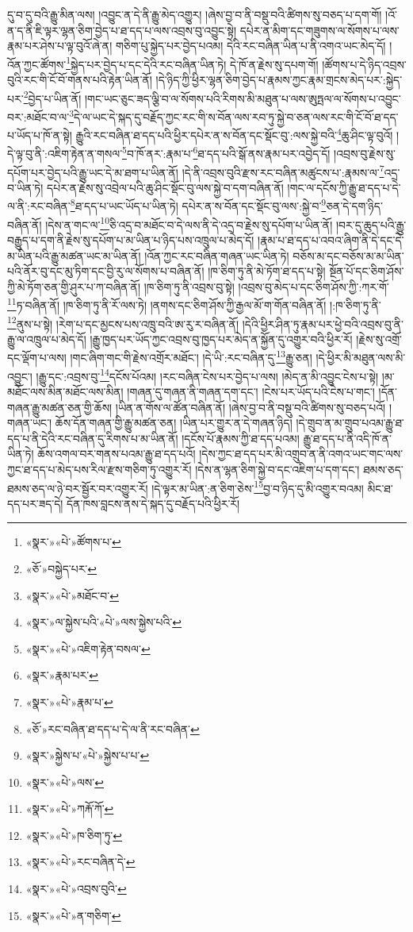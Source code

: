 དུ་བ་དུ་བའི་རྒྱུ་མིན་ལས། །འབྱུང་ན་དེ་ནི་རྒྱུ་མེད་འགྱུར། །ཞེས་བྱ་བ་ནི་བསྡུ་བའི་ཚིགས་སུ་བཅད་པ་དག་གོ། །འོ་ན་ད་ནི་ཇི་ལྟར་ལྷན་ཅིག་བྱེད་པ་ཐ་དད་པ་ལས་འབྲས་བུ་འབྱུང་སྟེ། དཔེར་ན་མིག་དང་གཟུགས་ལ་སོགས་པ་ལས་རྣམ་པར་ཤེས་པ་ལྟ་བུའོ་ཞེ་ན། གཅིག་པུ་སྐྱེད་པར་བྱེད་པའམ། དེའི་རང་བཞིན་ཡིན་པ་ནི་འགའ་ཡང་མེད་དོ། །འོན་ཀྱང་ཚོགས་\footnote{«སྣར་»«པེ་»ཚོགས་པ་}སྐྱེད་པར་བྱེད་པ་དང་དེའི་རང་བཞིན་ཡིན་ཏེ། དེ་ཁོ་ན་རྗེས་སུ་དཔག་གོ། །ཚོགས་པ་དེ་ཉིད་འབྲས་བུའི་རང་གི་ངོ་བོ་གནས་པའི་རྟེན་ཡིན་ནོ། །དེ་ཉིད་ཀྱི་ཕྱིར་ལྷན་ཅིག་བྱེད་པ་རྣམས་ཀྱང་རྣམ་གྲངས་མེད་པར་:སྐྱེད་པར་\footnote{«ཅོ་»བསྐྱེད་པར་}བྱེད་པ་ཡིན་ནོ། །གང་ཡང་ཅུང་ཟད་ལྕི་བ་ལ་སོགས་པའི་རིགས་མི་མཐུན་པ་ལས་ཨུཏྤལ་ལ་སོགས་པ་འབྱུང་བར་:མཐོང་བ་ལ་\footnote{«སྣར་»«པེ་»མཐོང་བ་}དེ་ལ་ཡང་དེ་སྐད་དུ་བརྗོད་ཀྱང་རང་གི་ས་བོན་ལས་རབ་ཏུ་སྐྱེ་བ་ཅན་ལས་རང་གི་ངོ་བོ་ཐ་དད་པ་ཡོད་པ་ཁོ་ན་སྟེ། རྒྱུའི་རང་བཞིན་ཐ་དད་པའི་ཕྱིར་དཔེར་ན་ས་བོན་དང་སྡོང་བུ་:ལས་སྐྱེ་བའི་\footnote{«སྣར་»ལ་སྐྱེས་པའི་«པེ་»ལས་སྐྱེས་པའི་}ཆུ་ཤིང་ལྟ་བུའོ། །དེ་ལྟ་བུ་ནི་:འཇིག་རྟེན་ན་གསལ་\footnote{«སྣར་»«པེ་»འཇིག་རྟེན་བསལ་}བ་ཁོ་ནར་:རྣམ་པ་\footnote{«སྣར་»རྣམ་པར་}ཐ་དད་པའི་སྒོ་ནས་རྣམ་པར་འབྱེད་དོ། །འབྲས་བུ་རྗེས་སུ་དཔོག་པར་བྱེད་པའི་རྒྱུ་ཡང་དེ་མ་ཐག་པ་ཡིན་ནོ། །དེ་ནི་འབྲས་བུའི་རྫས་རང་བཞིན་མཚུངས་པ་:རྣམས་ལ་\footnote{«སྣར་»«པེ་»རྣམ་པ་}འདྲ་བ་ཡིན་ཏེ། དཔེར་ན་རྗེས་སུ་འབྲེལ་པའི་ཆུ་ཤིང་སྡོང་བུ་ལས་སྐྱེ་བ་དག་བཞིན་ནོ། །གང་ལ་དངོས་ཀྱི་རྒྱུ་ཐ་དད་པ་དེ་ལ་ནི་:རང་བཞིན་\footnote{«ཅོ་»རང་བཞིན་ཐ་དད་པ་དེ་ལ་ནི་རང་བཞིན་}ཐ་དད་པ་ཡང་ཡོད་པ་ཡིན་ཏེ། དཔེར་ན་ས་བོན་དང་སྡོང་བུ་ལས་:སྐྱེ་བ་\footnote{«སྣར་»སྐྱེས་པ་«པེ་»སྐྱེས་པ་པ་}ཅན་དེ་དག་ཉིད་བཞིན་ནོ། །དེས་ན་གང་ལ་\footnote{«སྣར་»«པེ་»ལས་}ཅི་འདྲ་བ་མཐོང་བ་དེ་ལས་ནི་དེ་འདྲ་བ་རྗེས་སུ་དཔོག་པ་ཡིན་ནོ། །བར་དུ་ཆུད་པའི་རྒྱུ་བརྒྱུད་པ་དག་ནི་རྗེས་སུ་དཔོག་པ་མ་ཡིན་པ་ཉིད་པས་འཁྲུལ་པ་མེད་དོ། །རྣམ་པ་ཐ་དད་པ་འབའ་ཞིག་ནི་དེ་དང་དེ་མ་ཡིན་པའི་རྒྱུ་མཚན་ཡང་མ་ཡིན་ནོ། །འོན་ཀྱང་རང་བཞིན་གཞན་ཡང་ཡིན་ཏེ། བཅོས་མ་དང་བཅོས་མ་མ་ཡིན་པའི་ནོར་བུ་དང་མུ་ཏིག་དང་བྱི་རུ་ལ་སོགས་པ་བཞིན་ནོ། །ཁ་ཅིག་ཏུ་ནི་མེ་ཏོག་ཐ་དད་པ་སྟེ། སྔོན་པོ་དང་ཅིག་ཤོས་ཀྱི་མེ་ཏོག་ཅན་གྱི་ཤུར་པ་ཀ་བཞིན་ནོ། །ཁ་ཅིག་ཏུ་ནི་འབྲས་བུ་སྟེ། །འབྲས་བུ་མེད་པ་དང་ཅིག་ཤོས་ཀྱི་:ཀར་གོ་\footnote{«སྣར་»«པེ་»ཀརྐོ་ཀོ་}ཏ་བཞིན་ནོ། །ཁ་ཅིག་ཏུ་ནི་རོ་ལས་ཏེ། །ནགས་དང་ཅིག་ཤོས་ཀྱི་རྒྱལ་མོ་ག་གོན་བཞིན་ནོ། །:ཁ་ཅིག་ཏུ་ནི་\footnote{«སྣར་»«པེ་»ཁ་ཅིག་ཏུ་}ནུས་པ་སྟེ། །རེག་པ་དང་མྱངས་པས་འཁྲུ་བའི་ཨ་རུ་ར་བཞིན་ནོ། །དེའི་ཕྱིར་ཤིན་ཏུ་རྣམ་པར་ཕྱེ་བའི་འབྲས་བུ་ནི་རྒྱུ་ལ་འཁྲུལ་པ་མེད་དོ། །རྒྱུ་ཁྱད་པར་ཡོད་ཀྱང་འབྲས་བུ་ཁྱད་པར་མེད་ན་སྐྱོན་དུ་འགྱུར་བའི་ཕྱིར་རོ། །རྗེས་སུ་འགྲོ་དང་ལྡོག་པ་ལས། །གང་ཞིག་གང་གི་རྗེས་འགྲོར་མཐོང་། །དེ་ཡི་:རང་བཞིན་དུ་\footnote{«སྣར་»«པེ་»རང་བཞིན་དེ་}རྒྱུ་ཅན། །དེ་ཕྱིར་མི་མཐུན་ལས་མི་འབྱུང་། །རྒྱུ་དང་:འབྲས་བུ་\footnote{«སྣར་»«པེ་»འབྲས་བུའི་}དངོས་པོའམ། །རང་བཞིན་ངེས་པར་བྱེད་པ་ལས། །མེད་ན་མི་འབྱུང་ངེས་པ་སྟེ། །མ་མཐོང་ལས་མིན་མཐོང་ལས་མིན། །གཞན་དུ་གཞན་ནི་གཞན་དག་དང་། །ངེས་པར་ཡོད་པའི་ངེས་པ་གང་། །དོན་གཞན་རྒྱུ་མཚན་ཅན་གྱི་ཆོས། །ཡིན་ན་གོས་ལ་ཚོན་བཞིན་ནོ། །ཞེས་བྱ་བ་ནི་བསྡུ་བའི་ཚིགས་སུ་བཅད་པའོ། །གཞན་ཡང་། ཆོས་དོན་གཞན་གྱི་རྒྱུ་མཚན་ཅན། །ཡིན་པར་གྱུར་ན་དེ་གཞན་ཉིད། །དེ་གྲུབ་ན་མ་གྲུབ་པའམ་རྒྱུ་ཐ་དད་པ་ནི་དེའི་རང་བཞིན་དུ་རིགས་པ་མ་ཡིན་ནོ། །དངོས་པོ་རྣམས་ཀྱི་ཐ་དད་པའམ། རྒྱུ་ཐ་དད་པ་ནི་འདི་ཁོ་ན་ཡིན་ཏེ། ཆོས་འགལ་བར་གནས་པའམ་རྒྱུ་ཐ་དད་པའོ། །དེས་ཀྱང་ཐ་དད་པར་མི་འགྲུབ་ན་ནི་འགའ་ཡང་གང་ལས་ཀྱང་ཐ་དད་པ་མེད་པས་རིལ་རྫས་གཅིག་ཏུ་འགྱུར་རོ། །དེས་ན་ལྷན་ཅིག་སྐྱེ་བ་དང་འཇིག་པ་དག་དང་། ཐམས་ཅད་ཐམས་ཅད་ལ་ཉེ་བར་སྦྱོར་བར་འགྱུར་རོ། །དེ་ལྟར་མ་ཡིན་:ན་ཅིག་ཅེས་\footnote{«སྣར་»«པེ་»ན་གཅིག་}བྱ་བ་ཉིད་དུ་མི་འགྱུར་བའམ། མིང་ཐ་དད་པར་ཟད་དེ། དོན་ཁས་བླངས་ནས་དེ་སྐད་དུ་བརྗོད་པའི་ཕྱིར་རོ། 